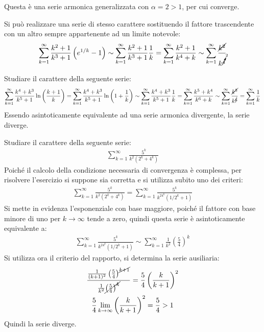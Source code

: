 \documentclass{article}
\numberwithin{equation}{subsection}
\begin{document}
Questa è una serie armonica generalizzata con $\alpha=2>1$, per cui converge. 


Si può realizzare una serie di stesso carattere sostituendo il fattore trascendente con un altro sempre appartenente ad un limite notevole:
\begin{gather*}
    \displaystyle\sum_{k=1}^\infty\frac{k^2+1}{k^3+1}\left(e^{1/k}-1\right)\sim
    \displaystyle\sum_{k=1}^\infty\frac{k^2+1}{k^3+1}\frac{1}{k}=
    \displaystyle\sum_{k=1}^\infty\frac{k^2+1}{k^4+k}\sim
    \displaystyle\sum_{k=1}^\infty\frac{\cancel{k^2}}{k^{\cancelto{2}{4}}}
\end{gather*}



Studiare il carattere della seguente serie:
\begin{gather*}
    \displaystyle\sum_{k=1}^\infty\frac{k^4+k^3}{k^5+1}\ln\left(\frac{k+1}{k}\right)=
    \displaystyle\sum_{k=1}^\infty\frac{k^4+k^3}{k^5+1}\ln\left(1+\frac{1}{k}\right)\sim
    \displaystyle\sum_{k=1}^\infty\frac{k^4+k^3}{k^5+1}\frac{1}{k}=
    \displaystyle\sum_{k=1}^\infty\frac{k^5+k^4}{k^6+k}\sim
    \displaystyle\sum_{k=1}^\infty\frac{\cancel{k^5}}{k^{\cancel{6}}}=
    \displaystyle\sum_{k=1}^\infty\frac{1}{k}
\end{gather*}
Essendo asintoticamente equivalente ad una serie armonica divergente, la serie diverge. 


Studiare il carattere della seguente serie:
\begin{gather*}
    \displaystyle\sum_{k=1}^\infty\frac{5^k}{k^2(2^k+4^k)}
\end{gather*}
Poiché il calcolo della condizione necessaria di convergenza è complessa, per risolvere l'esercizio si suppone sia corretta e si utilizza subito uno dei criteri:
\begin{gather*}
    \displaystyle\sum_{k=1}^\infty\frac{5^k}{k^2(2^k+4^k)}=
    \displaystyle\sum_{k=1}^\infty\frac{5^k}{k^24^k(1/2^k+1)}
\end{gather*}
Si mette in evidenza l'esponenziale con base maggiore, poiché il fattore con base minore di uno per $k\to\infty$ tende a zero, quindi questa serie è asintoticamente equivalente a:
\begin{gather*}
    \displaystyle\sum_{k=1}^\infty\frac{5^k}{k^24^k(1/2^k+1)}\sim
    \displaystyle\sum_{k=1}^\infty\frac{1}{k^2}\left(\frac{5}{4}\right)^k
\end{gather*}
Si utilizza ora il criterio del rapporto, si determina la serie ausiliaria:
\begin{gather*}
    \displaystyle\frac{\frac{1}{(k+1)^2}\left(\frac{5}{4}\right)^{\cancel{k+1}}}{\frac{1}{k^2}\cancel{\left(\frac{5}{4}\right)^k}}=\frac{5}{4}\left(\frac{k}{k+1}\right)^2\\
    \frac{5}{4}\lim_{k\to\infty}\left(\frac{k}{k+1}\right)^2=\frac{5}{4}>1
\end{gather*}
Quindi la serie diverge.  
\end{document}
